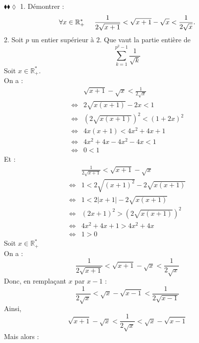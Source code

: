 \documentclass[11pt]{article}
\begin{document}
\begin{exercice}{$\blacklozenge\blacklozenge\lozenge$}{}
    1. Démontrer : 
    \begin{equation*}
        \forall{x\in\mathbb{R}^*_+}\hspace{0.5cm}\frac{1}{2\sqrt{x+1}}<\sqrt{x+1}-\sqrt{x}<\frac{1}{2\sqrt{x}}.
    \end{equation*}
    2. Soit $p$ un entier supérieur à $2$. Que vaut la partie entière de
    \begin{equation*}
        \sum_{k=1}^{p^2-1}{\frac{1}{\sqrt{k}}}
    \end{equation*}
    \tcblower
     Soit $x\in\mathbb{R}^*_+$.\\
    On a :
    \begin{align*}
        &\sqrt{x+1}-\sqrt{x}<\frac{1}{2\sqrt{x}}\\
        \iff&2\sqrt{x(x+1)}-2x<1\\
        \iff&(2\sqrt{x(x+1)})^2<(1+2x)^2\\
        \iff&4x(x+1)<4x^2+4x+1\\
        \iff&4x^2+4x-4x^2-4x<1\\
        \iff&0<1
    \end{align*}
    Et :
    \begin{align*}
        &\frac{1}{2\sqrt{x+1}}<\sqrt{x+1}-\sqrt{x}\\
        \iff&1<2\sqrt{(x+1)^2}-2\sqrt{x(x+1)}\\
        \iff&1<2|x+1|-2\sqrt{x(x+1)}\\
        \iff&(2x+1)^2>(2\sqrt{x(x+1)})^2\\
        \iff&4x^2+4x+1>4x^2+4x\\
        \iff&1>0
    \end{align*}
    Soit $x\in\mathbb{R}^*_+$\\
    On a :
    \begin{equation*}
        \frac{1}{2\sqrt{x+1}}<\sqrt{x+1}-\sqrt{x}<\frac{1}{2\sqrt{x}}
    \end{equation*}
    Donc, en remplaçant $x$ par $x-1$ :
    \begin{equation*}
        \frac{1}{2\sqrt{x}}<\sqrt{x}-\sqrt{x-1}<\frac{1}{2\sqrt{x-1}}
    \end{equation*}
    Ainsi,
    \begin{equation*}
        \sqrt{x+1}-\sqrt{x}<\frac{1}{2\sqrt{x}}<\sqrt{x}-\sqrt{x-1}
    \end{equation*}
    Mais alors :
    \begin{align*}

\end{align*}
\end{exercice}
\end{document}
